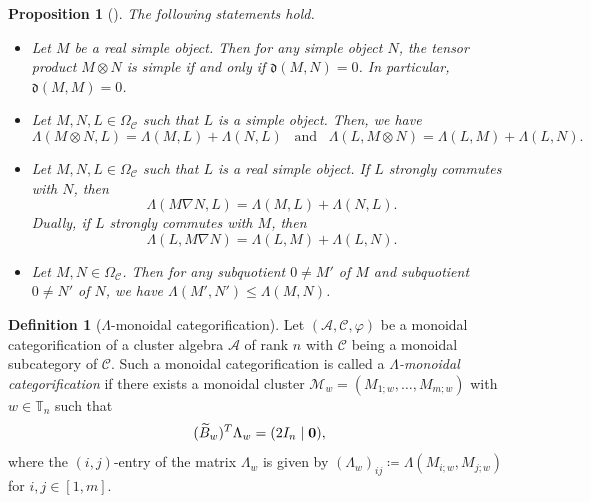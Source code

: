 \documentclass[12pt]{amsart}
\newtheorem{proposition}[theorem]{Proposition}
\theoremstyle{definition}
\newtheorem{definition}[theorem]{Definition}
\theoremstyle{remark}
\numberwithin{equation}{section}
\begin{document}
\begin{proposition}[{\cite[Corollary 3.17, Lemma 3.10, Lemma 4.3, Proposition 3.9]{kkop-2020}}]\label{pro:kkop-20} The following statements hold.
\begin{itemize}
\item[(i)] Let $M$ be a real simple object. Then for any simple object $N$, the tensor product $M\otimes N$ is simple if and only if $\mathfrak{d}(M,N)=0$. In particular, $\mathfrak{d}(M,M)=0$.
    \item [(ii)]  Let $M,N, L\in\Omega_{\mathscr{C}}$ such that $L$ is a simple object. Then, we have
\[\Lambda(M\otimes N,L)=\Lambda(M,L)+\Lambda(N,L)\;\;\;\text{and}\;\;\; \Lambda(L,M\otimes N)=\Lambda(L,M)+\Lambda(L,N).\]
\item[(iii)]  Let $M,N, L\in\Omega_{\mathscr{C}}$ such that $L$ is a real simple object. If $L$ strongly commutes with $N$, then
\[
\Lambda(M\nabla N,L)=\Lambda(M,L)+\Lambda(N,L).
\]
Dually,
if $L$ strongly commutes with $M$, then
\[ \Lambda(L,M\nabla N)=\Lambda(L,M)+\Lambda(L,N).
\]
\item[(iv)] Let $M,N\in\Omega_{\mathscr{C}}$. Then for any subquotient $0\neq M'$ of $M$ and subquotient $0\neq N'$ of $N$, we have 
$\Lambda(M',N')\leq \Lambda(M,N)$.
\end{itemize}
\end{proposition}


\begin{definition}[$\mathsf{\Lambda}$-monoidal categorification] \label{def:L-monoidal}
Let $(\mathcal A,\mathcal C,\varphi)$ be a monoidal categorification of a cluster algebra $\mathcal{A}$ of rank $n$ with $\mathcal C$ being a monoidal subcategory of $\mathscr{C}$. Such a monoidal categorification is called a  {\em ${\mathsf{\Lambda}}$-monoidal categorification} if  there exists a monoidal cluster $\mathcal M_w=(M_{1;w},\ldots, M_{m;w})$ with $w \in \mathbb{T}_n$ such that 
\begin{equation} \label{eq:Lmc}
(\widetilde B_w)^T\Lambda_w=(2I_n\mid{\bf 0}),
\end{equation}
where the $(i,j)$-entry of the matrix $\Lambda_w$ is given by 
$(\Lambda_w)_{ij}\coloneq \Lambda(M_{i;w},M_{j;w})$ for $i,j\in[1,m]$.
\end{definition}
\end{document}
